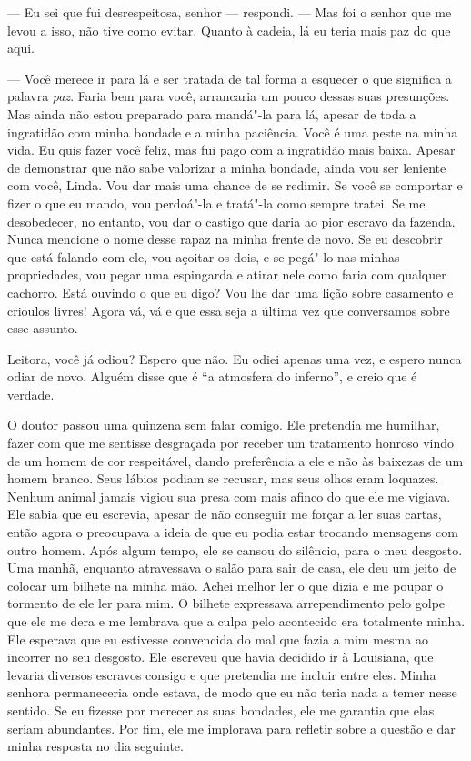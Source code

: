 --- Eu sei que fui desrespeitosa,
senhor --- respondi. --- Mas foi o senhor que me levou a isso, não tive
como evitar. Quanto à cadeia, lá eu teria mais paz do que aqui.

--- Você merece ir para lá e ser
tratada de tal forma a esquecer o que significa a palavra \emph{paz}.
Faria bem para você, arrancaria um pouco dessas suas presunções. Mas
ainda não estou preparado para mandá"-la para lá, apesar de toda a
ingratidão com minha bondade e a minha paciência. Você é uma peste na
minha vida. Eu quis fazer você feliz, mas fui pago com a ingratidão mais
baixa. Apesar de demonstrar que não sabe valorizar a minha bondade,
ainda vou ser leniente com você, Linda. Vou dar mais uma chance de se
redimir. Se você se comportar e fizer o que eu mando, vou perdoá"-la e
tratá"-la como sempre tratei. Se me desobedecer, no entanto, vou dar o
castigo que daria ao pior escravo da fazenda. Nunca mencione o nome
desse rapaz na minha frente de novo. Se eu descobrir que está falando
com ele, vou açoitar os dois, e se pegá"-lo nas minhas propriedades, vou
pegar uma espingarda e atirar nele como faria com qualquer cachorro.
Está ouvindo o que eu digo? Vou lhe dar uma lição sobre casamento e
crioulos livres! Agora vá, vá e que essa seja a última vez que
conversamos sobre esse assunto.

Leitora, você já odiou? Espero que não.
Eu odiei apenas uma vez, e espero nunca odiar de novo. Alguém disse que
é ``a atmosfera do inferno'', e creio que é verdade.

O doutor passou uma quinzena sem falar
comigo. Ele pretendia me humilhar, fazer com que me sentisse desgraçada
por receber um tratamento honroso vindo de um homem de cor respeitável,
dando preferência a ele e não às baixezas de um homem branco. Seus
lábios podiam se recusar, mas seus olhos eram loquazes. Nenhum animal
jamais vigiou sua presa com mais afinco do que ele me vigiava. Ele sabia
que eu escrevia, apesar de não conseguir me forçar a ler suas cartas,
então agora o preocupava a ideia de que eu podia estar trocando
mensagens com outro homem. Após algum tempo, ele se cansou do silêncio,
para o meu desgosto. Uma manhã, enquanto atravessava o salão para sair
de casa, ele deu um jeito de colocar um bilhete na minha mão. Achei
melhor ler o que dizia e me poupar o tormento de ele ler para mim. O
bilhete expressava arrependimento pelo golpe que ele me dera e me
lembrava que a culpa pelo acontecido era totalmente minha. Ele esperava
que eu estivesse convencida do mal que fazia a mim mesma ao incorrer no
seu desgosto. Ele escreveu que havia decidido ir à Louisiana, que
levaria diversos escravos consigo e que pretendia me incluir entre eles.
Minha senhora permaneceria onde estava, de modo que eu não teria nada a
temer nesse sentido. Se eu fizesse por merecer as suas bondades, ele me
garantia que elas seriam abundantes. Por fim, ele me implorava para
refletir sobre a questão e dar minha resposta no dia seguinte.


